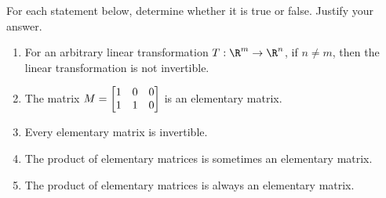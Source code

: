 \begin{exercises}
\begin{problist}
		\prob For each statement below, determine whether it is true or false. Justify your answer.
		\begin{enumerate}
			\item For an arbitrary linear transformation $T:\R^{m}\to\R^{n}$,
				if $n \neq m$, then the linear transformation is
				not invertible.

			\item The matrix $M = \mat{1&0&0\\1&1&0}$ is an elementary
				matrix.
			\item Every elementary matrix is invertible.
			\item The product of elementary matrices is sometimes an elementary matrix.
			\item The product of elementary matrices is always an elementary matrix.
		\end{enumerate}
	\end{problist}
\end{exercises}
